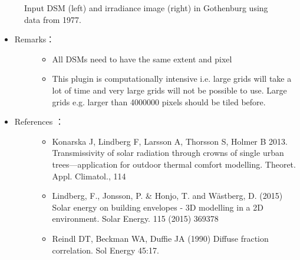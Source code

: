 \documentclass[letterpaper,10pt,english]{sphinxmanual}
\begin{document}
\begin{figure}[htbp]
\centering
\capstart

\noindent{}
\caption{Input DSM (left) and irradiance image (right) in Gothenburg using data from 1977.}\label{\detokenize{processor/Solar Radiation Solar Energy on Building Envelopes (SEBE):id2}}\end{figure}
\begin{itemize}
\item {} \begin{description}
\item[{Remarks：}] \leavevmode\begin{itemize}
\item {} 
All DSMs need to have the same extent and pixel

\item {} 
This plugin is computationally intensive i.e. large grids will take a lot of time and very large grids will not be possible to use. Large grids e.g. larger than 4000000 pixels should be tiled before.

\end{itemize}

\end{description}

\item {} \begin{description}
\item[{References ：}] \leavevmode\begin{itemize}
\item {} 
Konarska J, Lindberg F, Larsson A, Thorsson S, Holmer B 2013. Transmissivity of solar radiation through crowns of single urban trees—application for outdoor thermal comfort modelling. Theoret. Appl. Climatol., 1\textendash{}14 

\item {} 
Lindberg, F., Jonsson, P. \& Honjo, T. and Wästberg, D. (2015) Solar energy on building envelopes - 3D modelling in a 2D environment. Solar Energy. 115 (2015) 369\textendash{}378 

\item {} 
Reindl DT, Beckman WA, Duffie JA (1990) Diffuse fraction correlation. Sol Energy 45:1\textendash{}7. 

\end{itemize}

\end{description}

\end{itemize}
\end{document}

